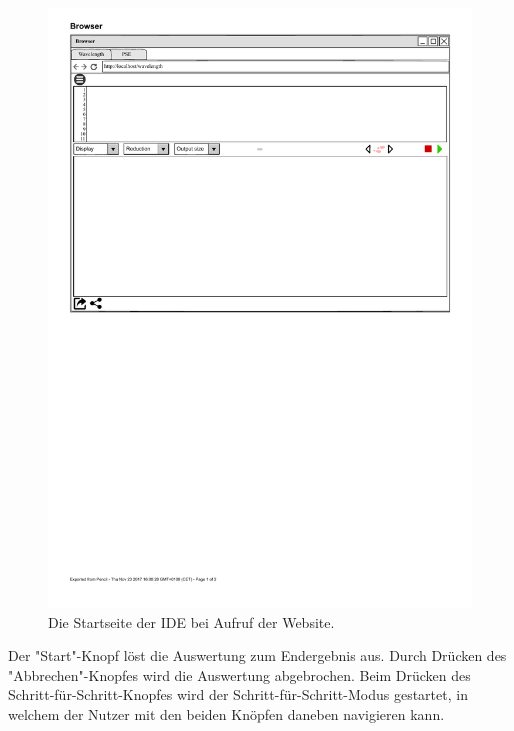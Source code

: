 \documentclass[parskip=full,11pt,twoside]{scrartcl}
\begin{document}
{\begin{figure}[H]
	\centering
	\includegraphics[width = \textwidth]{img/startseite}
	\caption{Die Startseite der IDE bei Aufruf der Website.} 
	\label{img:start}
\end{figure}


Der "Start"-Knopf löst die Auswertung zum Endergebnis aus. Durch Drücken des "Abbrechen"-Knopfes wird die Auswertung abgebrochen. Beim Drücken des Schritt-für-Schritt-Knopfes wird der Schritt-für-Schritt-Modus gestartet, in welchem der Nutzer mit den beiden Knöpfen daneben navigieren kann.

}
\end{document}
